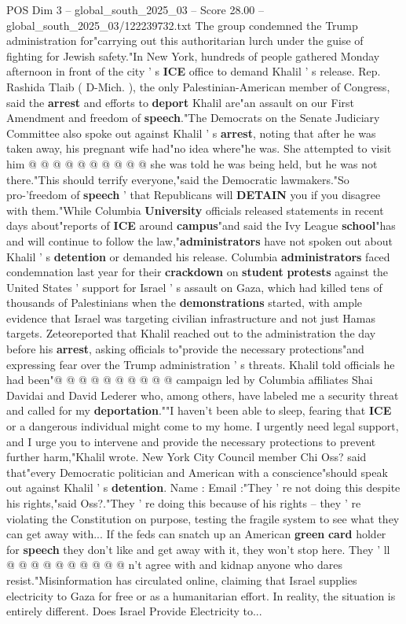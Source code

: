 \begin{textsample}{POS Dim 3 – global\_south\_2025\_03 – Score 28.00 – global\_south\_2025\_03/122239732.txt}
The group condemned the Trump administration for"carrying out this authoritarian lurch under the guise of fighting for Jewish safety."In New York, hundreds of people gathered Monday afternoon in front of the city ' s \textbf{ICE} office to demand Khalil ' s release.
Rep.
Rashida Tlaib ( D-Mich. ), the only Palestinian-American member of Congress, said the \textbf{arrest} and efforts to \textbf{deport} Khalil are"an assault on our First Amendment and freedom of \textbf{speech}."The Democrats on the Senate Judiciary Committee also spoke out against Khalil ' s \textbf{arrest}, noting that after he was taken away, his pregnant wife had"no idea where"he was.
She attempted to visit him @ @ @ @ @ @ @ @ @ @ she was told he was being held, but he was not there."This should terrify everyone,"said the Democratic lawmakers."So pro-'freedom of \textbf{speech} ' that Republicans will \textbf{DETAIN} you if you disagree with them."While Columbia \textbf{University} officials released statements in recent days about"reports of \textbf{ICE} around \textbf{campus}"and said the Ivy League \textbf{school}"has and will continue to follow the law,"\textbf{administrators} have not spoken out about Khalil ' s \textbf{detention} or demanded his release.
Columbia \textbf{administrators} faced condemnation last year for their \textbf{crackdown} on \textbf{student} \textbf{protests} against the United States ' support for Israel ' s assault on Gaza, which had killed tens of thousands of Palestinians when the \textbf{demonstrations} started, with ample evidence that Israel was targeting civilian infrastructure and not just Hamas targets.
Zeteoreported that Khalil reached out to the administration the day before his \textbf{arrest}, asking officials to"provide the necessary protections"and expressing fear over the Trump administration ' s threats.
Khalil told officials he had been"@ @ @ @ @ @ @ @ @ @ campaign led by Columbia affiliates Shai Davidai and David Lederer who, among others, have labeled me a security threat and called for my \textbf{deportation}.""I haven't been able to sleep, fearing that \textbf{ICE} or a dangerous individual might come to my home.
I urgently need legal support, and I urge you to intervene and provide the necessary protections to prevent further harm,"Khalil wrote.
New York City Council member Chi Oss? said that"every Democratic politician and American with a conscience"should speak out against Khalil ' s \textbf{detention}.
Name : Email :"They ' re not doing this despite his rights,"said Oss?."They ' re doing this because of his rights -- they ' re violating the Constitution on purpose, testing the fragile system to see what they can get away with...
If the feds can snatch up an American \textbf{green} \textbf{card} holder for \textbf{speech} they don't like and get away with it, they won't stop here.
They ' ll @ @ @ @ @ @ @ @ @ @ n't agree with and kidnap anyone who dares resist."Misinformation has circulated online, claiming that Israel supplies electricity to Gaza for free or as a humanitarian effort.
In reality, the situation is entirely different.
Does Israel Provide Electricity to...


\end{textsample}
